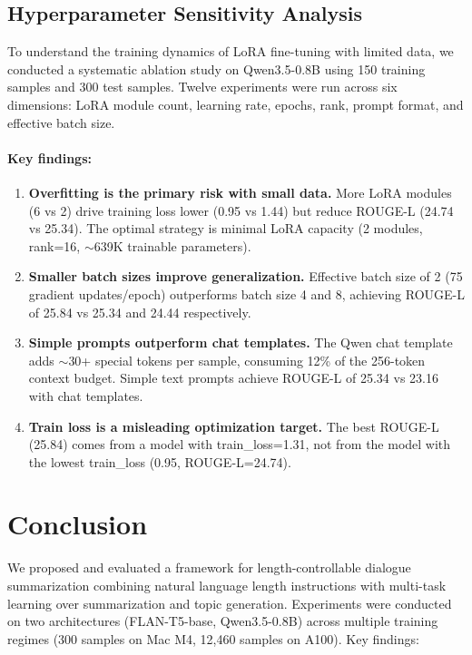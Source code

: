 \documentclass[11pt,a4paper]{article}
\begin{document}
\subsection{Hyperparameter Sensitivity Analysis}

To understand the training dynamics of LoRA fine-tuning with limited data, we conducted a systematic ablation study on Qwen3.5-0.8B using 150 training samples and 300 test samples.
Twelve experiments were run across six dimensions: LoRA module count, learning rate, epochs, rank, prompt format, and effective batch size.

\paragraph{Key findings:}

\begin{enumerate}[nosep]
  \item \textbf{Overfitting is the primary risk with small data.} More LoRA modules (6 vs 2) drive training loss lower (0.95 vs 1.44) but reduce ROUGE-L (24.74 vs 25.34). The optimal strategy is minimal LoRA capacity (2 modules, rank=16, $\sim$639K trainable parameters).
  \item \textbf{Smaller batch sizes improve generalization.} Effective batch size of 2 (75 gradient updates/epoch) outperforms batch size 4 and 8, achieving ROUGE-L of 25.84 vs 25.34 and 24.44 respectively.
  \item \textbf{Simple prompts outperform chat templates.} The Qwen chat template adds $\sim$30+ special tokens per sample, consuming 12\% of the 256-token context budget. Simple text prompts achieve ROUGE-L of 25.34 vs 23.16 with chat templates.
  \item \textbf{Train loss is a misleading optimization target.} The best ROUGE-L (25.84) comes from a model with train\_loss=1.31, not from the model with the lowest train\_loss (0.95, ROUGE-L=24.74).
\end{enumerate}

\section{Conclusion}

We proposed and evaluated a framework for length-controllable dialogue summarization combining natural language length instructions with multi-task learning over summarization and topic generation.
Experiments were conducted on two architectures (FLAN-T5-base, Qwen3.5-0.8B) across multiple training regimes (300 samples on Mac M4, 12,460 samples on A100).
Key findings:
\end{document}
